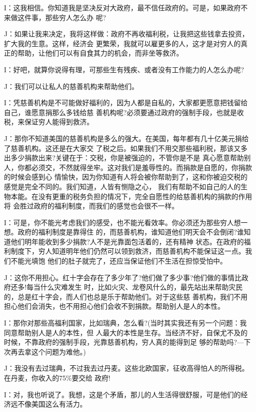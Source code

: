 ﻿\documentclass[11pt]{article}
\begin{document}
I：这我相信。你知道我是坚决反对大政府，最不信任政府的。可是，如果政府不来做这件事，那些穷人怎么办
呢?

J：如果让我来决定，我将这样做：政府不再收福利税，让我把这些钱拿去投资，扩大我的生意。这样，经济会
更繁荣，我就可以雇更多的人，这才是对穷人的真正的帮助，让他们可以有自食其力的机会，而非坐等救济。

I：好吧，就算你说得有理，可那些生有残疾、或者没有工作能力的人怎么办呢?

J：我们可以让私人的慈善机构来帮助他们。

I：凭慈善机构是不可能做好福利的，因为人都是自私的，大家都更愿意把钱留给自己，谁愿意捐那么多钱给慈
善机构呢?必须要通过政府的强制手段，也就是收税，来保证穷人能得到救济。

J：那你不知道美国的慈善机构是多么的强大。在美国，每年都有几十亿美元捐给了慈善机构。这还是在大家交
了税之后。如果我们不用交那些福利税，那该又多出多少捐款出来?关键在于：交税，你是被强迫的，不管你是不是
真心愿意帮助别人，你都必须交，不然就得坐牢。这对我们是羞辱性的。而捐款是自愿的，你捐款的时候会感到心
情愉快，因为你知道有人将会被你帮助到了，这和你被迫交税的感觉是完全不同的。我们知道，人皆有恻隐之心，
我们有帮助不如自己的人的生物本能。在没有更重的税务负担的情况下，完全自愿性的给慈善机构的捐款的作用将
会胜过政府的福利制度，而我们的感觉也会很不一样。

I：可是，你不能光考虑我们的感受，也不能光看效率。你必须还为那些穷人想一想。政府的福利制度是靠得住
的，而慈善机构，谁知道他们明天会不会倒闭?谁知道他们明年能收到多少捐款?人不是光靠面包活着的，还有精神
状态。在政府的福利制度下，穷人知道明年他们仍然可以领到救济，而慈善机构不能保证这一点。我们不能光填饱
他们的肚子就完了，还应当保证他们不生活在担惊受怕中。

J：这你不用担心。红十字会存在了多少年了?他们做了多少事?他们做的事情比政府还多!每当什么灾难发生
时，比如火灾、龙卷风什么的，最先站出来帮助灾民的，总是红十字会，而人们也总是乐于帮助他们。对于这些慈
善机构，我们不用担心他们会消失，也不用担心他们会收不到捐款。帮助别人是人的本性。

I：那你对那些高福利国家，比如瑞典，怎么看?(当时其实我还有另一个问题：我同意帮助别人是人的本性，但
人最大的本性是生存。当经济不好，自保尤不及的时候，不靠政府的强制手段，光靠慈善机构，穷人真的能得到足
够的帮助吗?---下次再去拿这个问题为难他。)

J：我没有去过瑞典，不过我去过丹麦。这些北欧国家，征收高得怕人的所得税。在丹麦，你收入的75\%要交给
政府!

I：对，我也听说了。我想，这是个矛盾，那儿的人生活得很舒服，可是他们的经济远不像美国这么有活力。
\end{document}
